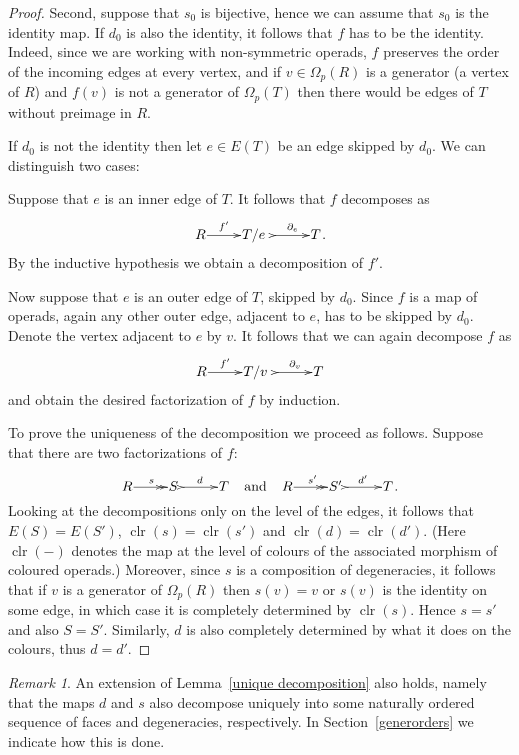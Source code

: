 \documentclass[a4paper]{amsart}
\theoremstyle{plain}
\theoremstyle{definition}
\theoremstyle{remark}
\newtheorem{rem}[thm]{Remark}
\DeclareMathOperator{\clr}{clr}
\numberwithin{equation}{section}
\numberwithin{figure}{section}
\begin{document}
\begin{proof}
    Second, suppose that $s_0$ is bijective, hence we can assume that
    $s_0$ is the identity map. If $ d_0$ is also the identity, it
    follows that $f$ has to be the identity. Indeed, since we are
    working with non-symmetric operads, $f$ preserves the order of the
    incoming edges at every vertex, and if $v\in\Omega_p(R)$ is a
    generator (a vertex of $R$) and $f(v)$ is not a generator of
    $\Omega_p(T)$ then there would be edges of $T$ without preimage in
    $R$.

    If $d_0$ is not the identity then let $e\in E(T)$ be an edge skipped by $d_0$. We can distinguish two cases:

    Suppose that $e$ is an inner edge of $T$. It follows that $f$ decomposes as
    $$\xymatrix@1{R\ar[r]^-{f'}&T/e\ \ \ar@{>->}[r]^-{\partial_e}&T}.$$
    By the inductive hypothesis we obtain a decomposition of $f'$.

    Now suppose that $e$ is an outer edge of $T$, skipped by $d_0$. Since $f$ is a map of operads, again any other outer edge,
    adjacent to $e$, has to be skipped by $d_0$. Denote the vertex adjacent to $e$ by $v$. It follows that we can again
    decompose $f$ as
    $$
        \xymatrix@1{R\ar[r]^-{f'}&T/v\ \ \ar@{>->}[r]^-{\partial_v}&T}
    $$
    and obtain the desired factorization of $f$ by induction.

    To prove the uniqueness of the decomposition we proceed as follows. Suppose that there are two factorizations of $f$:
    $$
        \xymatrix@1{R\ar@{->>}[r]^s&S\ \ar@{>->}[r]^d &T} \ \ \ \mbox{and}\ \ \  \xymatrix@1{R\ar@{->>}[r]^{s'}&S'\
            \ar@{>->}[r]^{d'} &T}.
    $$
    Looking at the decompositions only on the level of the edges, it
    follows that $E(S)=E(S')$, $\clr(s)=\clr(s')$ and
    $\clr(d)=\clr(d')$. (Here $\clr(-)$ denotes the map at the level of
    colours of the associated morphism of coloured operads.) Moreover,
    since $s$ is a composition of degeneracies, it follows that if $v$
    is a generator of $\Omega_p(R)$ then $s(v)=v$ or $s(v)$ is the
    identity on some edge, in which case it is completely determined by
    $\clr(s)$. Hence $s=s'$ and also $S=S'$. Similarly, $d$ is also
    completely determined by what it does on the colours, thus $d=d'$.
\end{proof}

\begin{rem}
    An extension of Lemma~\ref{unique decomposition} also holds, namely that the maps $d$ and $s$ also decompose uniquely into some naturally
    ordered sequence of faces and degeneracies, respectively. In Section~\ref{generorders} we indicate how this is done.
\end{rem}
\end{document}
